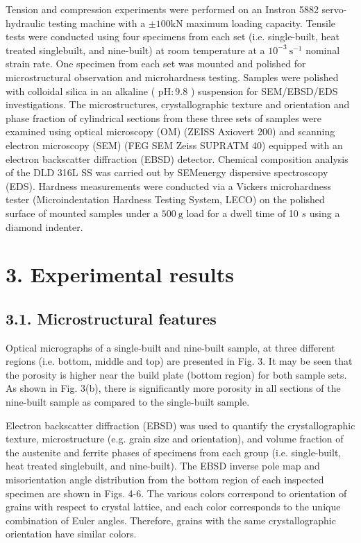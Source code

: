\documentclass[10pt]{article}
\begin{document}
Tension and compression experiments were performed on an Instron 5882 servo-hydraulic testing machine with a $\pm 100 \mathrm{kN}$ maximum loading capacity. Tensile tests were conducted using four specimens from each set (i.e. single-built, heat treated singlebuilt, and nine-built) at room temperature at a $10^{-3} \mathrm{~s}^{-1}$ nominal strain rate. One specimen from each set was mounted and polished for microstructural observation and microhardness testing. Samples were polished with colloidal silica in an alkaline ( $\mathrm{pH}: 9.8$ ) suspension for SEM/EBSD/EDS investigations. The microstructures, crystallographic texture and orientation and phase fraction of cylindrical sections from these three sets of samples were examined using optical microscopy (OM) (ZEISS Axiovert 200) and scanning electron microscopy (SEM) (FEG SEM Zeiss SUPRATM 40) equipped with an electron backscatter diffraction (EBSD) detector. Chemical composition analysis of the DLD 316L SS was carried out by SEMenergy dispersive spectroscopy (EDS). Hardness measurements were conducted via a Vickers microhardness tester (Microindentation Hardness Testing System, LECO) on the polished surface of mounted samples under a $500 \mathrm{~g}$ load for a dwell time of 10 $s$ using a diamond indenter.

\section*{3. Experimental results}
\subsection*{3.1. Microstructural features}
Optical micrographs of a single-built and nine-built sample, at three different regions (i.e. bottom, middle and top) are presented in Fig. 3. It may be seen that the porosity is higher near the build plate (bottom region) for both sample sets. As shown in Fig. 3(b), there is significantly more porosity in all sections of the nine-built sample as compared to the single-built sample.

Electron backscatter diffraction (EBSD) was used to quantify the crystallographic texture, microstructure (e.g. grain size and orientation), and volume fraction of the austenite and ferrite phases of specimens from each group (i.e. single-built, heat treated singlebuilt, and nine-built). The EBSD inverse pole map and misorientation angle distribution from the bottom region of each inspected specimen are shown in Figs. 4-6. The various colors correspond to orientation of grains with respect to crystal lattice, and each color corresponds to the unique combination of Euler angles. Therefore, grains with the same crystallographic orientation have similar colors.
\end{document}
